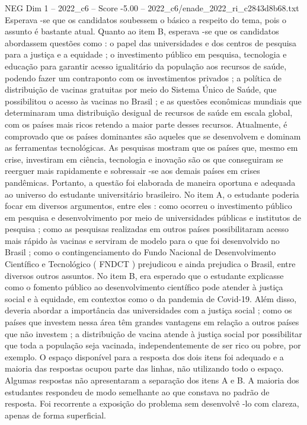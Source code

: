 \begin{textsample}{NEG Dim 1 – 2022\_c6 – Score -5.00 – 2022\_c6/enade\_2022\_ri\_c2843d8b68.txt}
Esperava -se que os candidatos soubessem o básico a respeito do tema, pois o assunto é bastante atual.
Quanto ao item B, esperava -se que os candidatos abordassem questões como : o papel das universidades e dos centros de pesquisa para a justiça e a equidade ; o investimento público em pesquisa, tecnologia e educação para garantir acesso igualitário da população aos recursos de saúde, podendo fazer um contraponto com os investimentos privados ; a política de distribuição de vacinas gratuitas por meio do Sistema Único de Saúde, que possibilitou o acesso às vacinas no Brasil ; e as questões econômicas mundiais que determinaram uma distribuição desigual de recursos de saúde em escala global, com os países mais ricos retendo a maior parte desses recursos.
Atualmente, é comprovado que os países dominantes são aqueles que se desenvolvem e dominam as ferramentas tecnológicas.
As pesquisas mostram que os países que, mesmo em crise, investiram em ciência, tecnologia e inovação são os que conseguiram se reerguer mais rapidamente e sobressair -se aos demais países em crises pandêmicas.
Portanto, a questão foi elaborada de maneira oportuna e adequada ao universo do estudante universitário brasileiro.
No item A, o estudante poderia focar em diversos argumentos, entre eles : como ocorreu o investimento público em pesquisa e desenvolvimento por meio de universidades públicas e institutos de pesquisa ; como as pesquisas realizadas em outros países possibilitaram acesso mais rápido às vacinas e serviram de modelo para o que foi desenvolvido no Brasil ; como o contingenciamento do Fundo Nacional de Desenvolvimento Científico e Tecnológico ( FNDCT ) prejudicou e ainda prejudica o Brasil, entre diversos outros assuntos.
No item B, era esperado que o estudante explicasse como o fomento público ao desenvolvimento científico pode atender à justiça social e à equidade, em contextos como o da pandemia de Covid-19.
Além disso, deveria abordar a importância das universidades com a justiça social ; como os países que investem nessa área têm grandes vantagens em relação a outros países que não investem ; a distribuição de vacina atende à justiça social por possibilitar que toda a população seja vacinada, independentemente de ser rico ou pobre, por exemplo.
O espaço disponível para a resposta dos dois itens foi adequado e a maioria das respostas ocupou parte das linhas, não utilizando todo o espaço.
Algumas respostas não apresentaram a separação dos itens A e B.
A maioria dos estudantes respondeu de modo semelhante ao que constava no padrão de resposta.
Foi recorrente a exposição do problema sem desenvolvê -lo com clareza, apenas de forma superficial.

\end{textsample}
